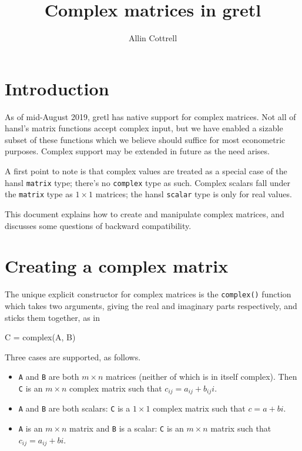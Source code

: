 \documentclass{article}
\begin{document}
\setlength{\parindent}{0pt}
\setlength{\parskip}{1ex}
\setcounter{secnumdepth}{2}

\title{Complex matrices in gretl}
\author{Allin Cottrell}
\maketitle

\section{Introduction}
\label{sec:intro}

As of mid-August 2019, gretl has native support for complex
matrices. Not all of hansl's matrix functions accept complex input,
but we have enabled a sizable subset of these functions which we
believe should suffice for most econometric purposes. Complex support
may be extended in future as the need arises.

A first point to note is that complex values are treated as a special
case of the hansl \texttt{matrix} type; there's no \texttt{complex}
type as such. Complex scalars fall under the \texttt{matrix} type as
$1 \times 1$ matrices; the hansl \texttt{scalar} type is only for real
values.

This document explains how to create and manipulate complex matrices,
and discusses some questions of backward compatibility.

\section{Creating a complex matrix}
\label{sec:create}

The unique explicit constructor for complex matrices is the
\texttt{complex()} function which takes two arguments, giving the real
and imaginary parts respectively, and sticks them together, as in
\begin{code}
C = complex(A, B)
\end{code}
Three cases are supported, as follows.
\begin{itemize}
\item \texttt{A} and \texttt{B} are both $m \times n$ matrices
  (neither of which is in itself complex). Then \texttt{C} is an
  $m \times n$ complex matrix such that $c_{ij} = a_{ij} + b_{ij}i$.
\item \texttt{A} and \texttt{B} are both scalars: \texttt{C} is a
  $1 \times 1$ complex matrix such that $c = a + bi$.
\item \texttt{A} is an $m \times n$ matrix and \texttt{B} is a scalar:
  \texttt{C} is an $m \times n$ matrix such that
  $c_{ij} = a_{ij} + bi$.
\end{itemize}
\end{document}
